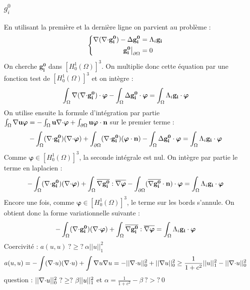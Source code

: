\subsubsection{$g_i^0$}
En utilisant la première et la dernière ligne on parvient au problème :
\begin{equation}
\label{gi0}
\left\{
\begin{aligned}
{\nabla}({\nabla\cdot} \mathbf{g_i^0})-{\Delta} \mathbf{g_i^0} &= \Lambda_i\mathbf{g_i}\\
\mathbf{g_i^0}{\big\rvert_{\partial\Omega}} &= 0
\end{aligned}
\right.
\end{equation}
On cherche $\mathbf{g_i^0}$ dans $[H^1_0(\Omega)]^3$. On multiplie donc cette équation par une fonction test de $[H^1_0(\Omega)]^3$ et on intègre :
\[
\int_\Omega {\nabla}({\nabla\cdot} \mathbf{g_i^0})\cdot\bm{\varphi} - \int_\Omega {\Delta} \mathbf{g_i^0}\cdot\bm{\varphi} = \int_\Omega \Lambda_i\mathbf{g_i}\cdot\bm{\varphi}
\]
On utilise ensuite la formule d'intégration par partie $\int_\Omega {\nabla}{\mathbf{u}}\bm{\varphi} = -\int_\Omega \mathbf{u}{\nabla\cdot}\bm{\varphi} + \int_{\partial\Omega} \mathbf{u}\bm{\varphi}\cdot \mathbf{n}$ sur le premier terme :
\[
-\int_\Omega ({\nabla\cdot} \mathbf{g_i^0})({\nabla\cdot}\bm{\varphi}) + \int_{\partial\Omega} ({\nabla\cdot} \mathbf{g_i^0})(\bm{\varphi}\cdot \mathbf{n}) - \int_\Omega {\Delta} \mathbf{g_i^0}\cdot\bm{\varphi} = \int_\Omega \Lambda_i\mathbf{g_i}\cdot\bm{\varphi}
\]
Comme $\bm{\varphi}\in [H^1_0(\Omega)]^3$, la seconde intégrale est nul. On intègre par partie le terme en laplacien :
\[
-\int_\Omega ({\nabla\cdot} \mathbf{g_i^0})({\nabla\cdot}\bm{\varphi}) + \int_\Omega \overline{{\nabla} \mathbf{g_i^0}}:\overline{{\nabla}\bm{\varphi}} - \int_{\partial\Omega} (\overline{{\nabla} \mathbf{g_i^0}}\cdot \mathbf{n})\cdot\bm{\varphi} = \int_\Omega \Lambda_i\mathbf{g_i}\cdot\bm{\varphi}
\]
Encore une fois, comme $\bm{\varphi}\in [H^1_0(\Omega)]^3$, le terme sur les bords s'annule. On obtient donc la forme variationnelle suivante :
\begin{equation}
\label{fvgi0}
-\int_\Omega ({\nabla\cdot} \mathbf{g_i^0})({\nabla\cdot}\bm{\varphi}) + \int_\Omega \overline{{\nabla} \mathbf{g_i^0}}:\overline{{\nabla}\bm{\varphi}} = \int_\Omega \Lambda_i\mathbf{g_i}\cdot\bm{\varphi}
\end{equation}
Coercivité : $a(u,u)\ ?\geq?\ \alpha||u||^2_1$\\
\[a(u,u)=-\int({\nabla\cdot} u)({\nabla\cdot} u) + \int {\nabla} u{\nabla} u = -||{\nabla\cdot} u||_0^2 + ||{\nabla} u||^2_0 \geq \frac{1}{1+c^2}||u||^2_1 - ||{\nabla\cdot} u||^2_0\]
question : $||{\nabla\cdot} u||^2_0\ ?\geq?\ \beta ||u||^2_1$ et $\alpha=\frac{1}{1+c^2}-\beta\ ?>?\ 0$\\

